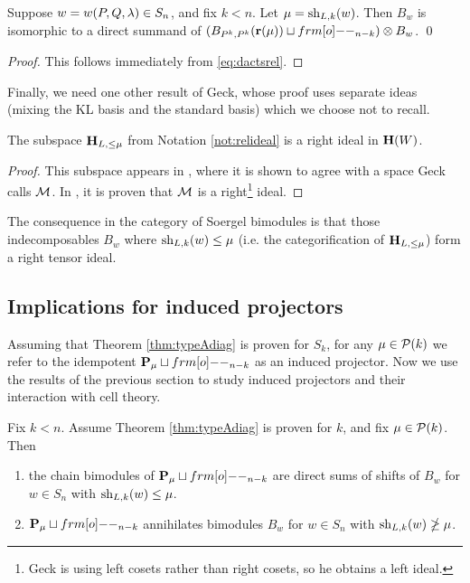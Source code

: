 \begin{cor}\label{cor:relativeUnit}
Suppose $w=w(P,Q,\lambda) \in S_n$, and fix $k < n$.  Let $\mu = \operatorname{sh}_{L,k}(w)$. Then $B_w$ is isomorphic to a direct summand of $(B_{P^k,P^k}(\rbb(\mu)) \sqcup \one_{n-k})\otimes B_w$. \qed
\end{cor}

\begin{proof} This follows immediately from \eqref{eq:dactsrel}. \end{proof}

Finally, we need one other result of Geck, whose proof uses separate ideas (mixing the KL basis and the standard basis) which we choose not to recall.

\begin{lemma} \label{lem:itsarightideal}
The subspace ${\mathbf H}_{L,\le \mu}$ from Notation \ref{not:relideal} is a right ideal in ${\mathbf H}(W)$. \end{lemma}

\begin{proof} This subspace appears in \cite[Corollary 3.4]{GeckInduction}, where it is shown to agree with a space Geck calls ${\mathcal{M}}$. In \cite[Lemma 2.2]{GeckInduction}, it is proven that ${\mathcal{M}}$ is a right\footnote{Geck is using left cosets rather than right cosets, so he obtains a left ideal.} ideal. \end{proof}

The consequence in the category of Soergel bimodules is that those indecomposables $B_w$ where $\operatorname{sh}_{L,k}(w) \le \mu$ (i.e. the categorification of ${\mathbf H}_{L,\le
\mu}$) form a right tensor ideal. 

\subsection{Implications for induced projectors}
\label{subsec:implications}

Assuming that Theorem \ref{thm:typeAdiag} is proven for $S_k$, for any $\mu \in {\mathcal{P}}(k)$ we refer to the idempotent $\PB_\mu \sqcup \one_{n-k}$ as an induced projector. Now we use the
results of the previous section to study induced projectors and their interaction with cell theory. 

\begin{lemma} \label{lem:relprojkills} Fix $k < n$. Assume Theorem \ref{thm:typeAdiag} is proven for $k$, and fix $\mu \in {\mathcal{P}}(k)$. Then \begin{enumerate}
	\item the chain bimodules of $\PB_\mu \sqcup \one_{n-k}$ are direct sums of shifts of $B_w$ for $w \in S_n$ with $\operatorname{sh}_{L,k}(w) \le \mu$.
	\item $\PB_\mu \sqcup \one_{n-k}$ annihilates bimodules $B_w$ for $w \in S_n$ with $\operatorname{sh}_{L,k}(w) \ngeq \mu$.
\end{enumerate}
\end{lemma}

